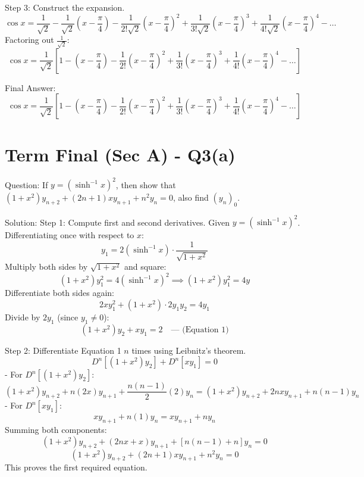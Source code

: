 \documentclass{article}
\begin{document}
Step 3: Construct the expansion.
\[
\cos x = \frac{1}{\sqrt{2}} - \frac{1}{\sqrt{2}}\left(x-\frac{\pi}{4}\right) - \frac{1}{2!\sqrt{2}}\left(x-\frac{\pi}{4}\right)^2 + \frac{1}{3!\sqrt{2}}\left(x-\frac{\pi}{4}\right)^3 + \frac{1}{4!\sqrt{2}}\left(x-\frac{\pi}{4}\right)^4 - \dots
\]
Factoring out $\frac{1}{\sqrt{2}}$:
\[
\cos x = \frac{1}{\sqrt{2}} \left[ 1 - \left(x-\frac{\pi}{4}\right) - \frac{1}{2!}\left(x-\frac{\pi}{4}\right)^2 + \frac{1}{3!}\left(x-\frac{\pi}{4}\right)^3 + \frac{1}{4!}\left(x-\frac{\pi}{4}\right)^4 - \dots \right]
\]

Final Answer:
\[
\boxed{\cos x = \frac{1}{\sqrt{2}} \left[ 1 - \left(x-\frac{\pi}{4}\right) - \frac{1}{2!}\left(x-\frac{\pi}{4}\right)^2 + \frac{1}{3!}\left(x-\frac{\pi}{4}\right)^3 + \frac{1}{4!}\left(x-\frac{\pi}{4}\right)^4 - \dots \right]}
\]

\section*{Term Final (Sec A) - Q3(a)}
Question:
If $y = (\sinh^{-1} x)^2$, then show that $(1+x^2)y_{n+2} + (2n+1)xy_{n+1} + n^2 y_n = 0$, also find $(y_n)_0$.

Solution:
Step 1: Compute first and second derivatives.
Given $y = (\sinh^{-1} x)^2$. Differentiating once with respect to $x$:
\[
y_1 = 2(\sinh^{-1} x) \cdot \frac{1}{\sqrt{1+x^2}}
\]
Multiply both sides by $\sqrt{1+x^2}$ and square:
\[
(1+x^2)y_1^2 = 4(\sinh^{-1} x)^2 \implies (1+x^2)y_1^2 = 4y
\]
Differentiate both sides again:
\[
2x y_1^2 + (1+x^2)\cdot 2y_1y_2 = 4y_1
\]
Divide by $2y_1$ (since $y_1 \ne 0$):
\[
(1+x^2)y_2 + x y_1 = 2 \quad \text{--- (Equation 1)}
\]

Step 2: Differentiate Equation 1 $n$ times using Leibnitz's theorem.
\[
D^n\left[ (1+x^2)y_2 \right] + D^n[x y_1] = 0
\]
- For $D^n\left[(1+x^2)y_2\right]$:
  \[
  (1+x^2)y_{n+2} + n(2x)y_{n+1} + \frac{n(n-1)}{2}(2)y_n = (1+x^2)y_{n+2} + 2n x y_{n+1} + n(n-1)y_n
  \]
- For $D^n[x y_1]$:
  \[
  x y_{n+1} + n(1)y_n = x y_{n+1} + n y_n
  \]
Summing both components:
\[
(1+x^2)y_{n+2} + (2n x + x)y_{n+1} + [n(n-1) + n]y_n = 0
\]
\[
(1+x^2)y_{n+2} + (2n+1)xy_{n+1} + n^2 y_n = 0
\]
This proves the first required equation.
\end{document}
